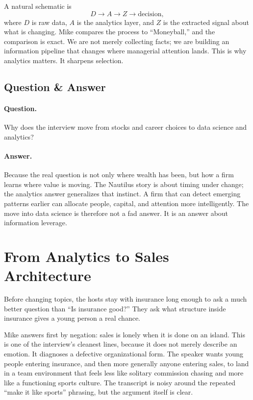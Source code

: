 A natural schematic is
\begin{equation}
D \rightarrow A \rightarrow Z \rightarrow \text{decision},
\end{equation}
where \(D\) is raw data, \(A\) is the analytics layer, and \(Z\) is the extracted signal about what is changing. Mike compares the process to ``Moneyball,'' and the comparison is exact. We are not merely collecting facts; we are building an information pipeline that changes where managerial attention lands. This is why analytics matters. It sharpens selection.

\subsection{Question \& Answer}

\paragraph{Question.} Why does the interview move from stocks and career choices to data science and analytics?

\paragraph{Answer.} Because the real question is not only where wealth has been, but how a firm learns where value is moving. The Nautilus story is about timing under change; the analytics answer generalizes that instinct. A firm that can detect emerging patterns earlier can allocate people, capital, and attention more intelligently. The move into data science is therefore not a fad answer. It is an answer about information leverage.

\section{From Analytics to Sales Architecture}

Before changing topics, the hosts stay with insurance long enough to ask a much better question than ``Is insurance good?'' They ask what structure inside insurance gives a young person a real chance.

Mike answers first by negation: sales is lonely when it is done on an island. This is one of the interview's cleanest lines, because it does not merely describe an emotion. It diagnoses a defective organizational form. The speaker wants young people entering insurance, and then more generally anyone entering sales, to land in a team environment that feels less like solitary commission chasing and more like a functioning sports culture. The transcript is noisy around the repeated ``make it like sports'' phrasing, but the argument itself is clear.

